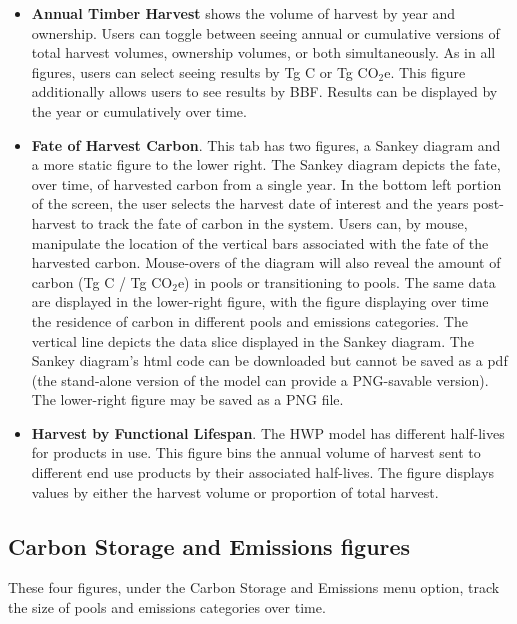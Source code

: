 \documentclass[
  openany]{book}
\begin{document}
\begin{itemize}
\item
  \textbf{Annual Timber Harvest} shows the volume of harvest by year and
  ownership. Users can toggle between seeing annual or cumulative
  versions of total harvest volumes, ownership volumes, or both
  simultaneously. As in all figures, users can select seeing results by
  Tg C or Tg CO\(_2\)e. This figure additionally allows users to see
  results by BBF. Results can be displayed by the year or cumulatively
  over time.
\item
  \textbf{Fate of Harvest Carbon}. This tab has two figures, a Sankey
  diagram and a more static figure to the lower right. The Sankey
  diagram depicts the fate, over time, of harvested carbon from a single
  year. In the bottom left portion of the screen, the user selects the
  harvest date of interest and the years post-harvest to track the fate
  of carbon in the system. Users can, by mouse, manipulate the location
  of the vertical bars associated with the fate of the harvested carbon.
  Mouse-overs of the diagram will also reveal the amount of carbon (Tg C
  / Tg CO\(_2\)e) in pools or transitioning to pools. The same data are
  displayed in the lower-right figure, with the figure displaying over
  time the residence of carbon in different pools and emissions
  categories. The vertical line depicts the data slice displayed in the
  Sankey diagram. The Sankey diagram's html code can be downloaded but
  cannot be saved as a pdf (the stand-alone version of the model can
  provide a PNG-savable version). The lower-right figure may be saved as
  a PNG file.
\item
  \textbf{Harvest by Functional Lifespan}. The HWP model has different
  half-lives for products in use. This figure bins the annual volume of
  harvest sent to different end use products by their associated
  half-lives. The figure displays values by either the harvest volume or
  proportion of total harvest.
\end{itemize}

\hypertarget{app-shiny-cse}{%
\subsection{Carbon Storage and Emissions figures}\label{app-shiny-cse}}

These four figures, under the Carbon Storage and Emissions menu option,
track the size of pools and emissions categories over time.
\end{document}
